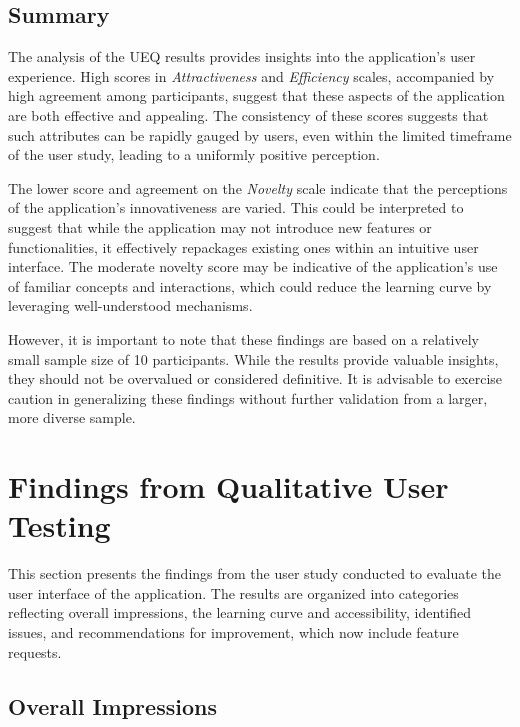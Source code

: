 \subsection*{Summary}

The analysis of the UEQ results provides insights into the application's user experience.
High scores in \emph{Attractiveness} and \emph{Efficiency} scales, accompanied by high agreement among participants, suggest that these aspects of the application are both effective and appealing.
The consistency of these scores suggests that such attributes can be rapidly gauged by users, even within the limited timeframe of the user study, leading to a uniformly positive perception.

The lower score and agreement on the \emph{Novelty} scale indicate that the perceptions of the application's innovativeness are varied.
This could be interpreted to suggest that while the application may not introduce new features or functionalities, it effectively repackages existing ones within an intuitive user interface.
The moderate novelty score may be indicative of the application's use of familiar concepts and interactions, which could reduce the learning curve by leveraging well-understood mechanisms.

However, it is important to note that these findings are based on a relatively small sample size of 10 participants.
While the results provide valuable insights, they should not be overvalued or considered definitive.
It is advisable to exercise caution in generalizing these findings without further validation from a larger, more diverse sample.

\section{Findings from Qualitative User Testing}
\label{sec:result:qualitative}

This section presents the findings from the user study conducted to evaluate the user interface of the application.
The results are organized into categories reflecting overall impressions, the learning curve and accessibility, identified issues, and recommendations for improvement, which now include feature requests.

\subsection*{Overall Impressions}
\label{sec:results:overall_impressions}

